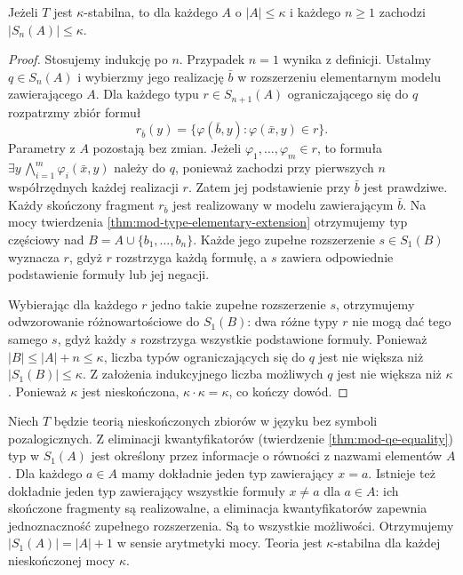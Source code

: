 \begin{twierdzenie}
\label{thm:mod-stability-finite-tuples}
Jeżeli $T$ jest $\kappa$-stabilna, to dla każdego
$A$ o $|A|\leq\kappa$ i każdego $n\geq1$
zachodzi $|S_n(A)|\leq\kappa$.
\end{twierdzenie}
\begin{proof}
Stosujemy indukcję po $n$. Przypadek $n=1$
wynika z definicji. Ustalmy $q\in S_n(A)$
i wybierzmy jego realizację $\bar b$ w
rozszerzeniu elementarnym modelu zawierającego $A$.
Dla każdego typu $r\in S_{n+1}(A)$ ograniczającego
się do $q$ rozpatrzmy zbiór formuł
\[
r_{\bar b}(y)=
\{\varphi(\bar b,y):\varphi(\bar x,y)\in r\}.
\]
Parametry z $A$ pozostają bez zmian. Jeżeli
$\varphi_1,\ldots,\varphi_m\in r$, to formuła
$\exists y\,\bigwedge_{i=1}^{m}\varphi_i(\bar x,y)$
należy do $q$, ponieważ zachodzi przy pierwszych
$n$ współrzędnych każdej realizacji $r$.
Zatem jej podstawienie przy $\bar b$ jest prawdziwe.
Każdy skończony fragment $r_{\bar b}$ jest realizowany
w modelu zawierającym $\bar b$. Na mocy twierdzenia
\ref{thm:mod-type-elementary-extension} otrzymujemy
typ częściowy nad $B=A\cup\{b_1,\ldots,b_n\}$.
Każde jego zupełne rozszerzenie $s\in S_1(B)$
wyznacza $r$, gdyż $r$ rozstrzyga każdą formułę,
a $s$ zawiera odpowiednie podstawienie formuły
lub jej negacji.

Wybierając dla każdego $r$ jedno takie zupełne
rozszerzenie $s$, otrzymujemy odwzorowanie
różnowartościowe do $S_1(B)$: dwa różne typy $r$
nie mogą dać tego samego $s$, gdyż każdy $s$
rozstrzyga wszystkie podstawione formuły.
Ponieważ $|B|\leq |A|+n\leq\kappa$,
liczba typów ograniczających się do $q$ jest
nie większa niż $|S_1(B)|\leq\kappa$.
Z założenia indukcyjnego liczba możliwych $q$
jest nie większa niż $\kappa$.
Ponieważ $\kappa$ jest nieskończona,
$\kappa\cdot\kappa=\kappa$, co kończy dowód.
\end{proof}

\begin{przyklad}
\label{ex:mod-stability-equality}
Niech $T$ będzie teorią nieskończonych zbiorów
w języku bez symboli pozalogicznych.
Z eliminacji kwantyfikatorów
(twierdzenie \ref{thm:mod-qe-equality})
typ w $S_1(A)$ jest określony przez informacje
o równości z nazwami elementów $A$.
Dla każdego $a\in A$ mamy dokładnie jeden typ
zawierający $x=a$. Istnieje też dokładnie jeden
typ zawierający wszystkie formuły $x\ne a$
dla $a\in A$: ich skończone fragmenty są
realizowalne, a eliminacja kwantyfikatorów
zapewnia jednoznaczność zupełnego rozszerzenia.
Są to wszystkie możliwości. Otrzymujemy
$|S_1(A)|=|A|+1$ w sensie arytmetyki mocy.
Teoria jest $\kappa$-stabilna dla każdej
nieskończonej mocy $\kappa$.
\end{przyklad}

